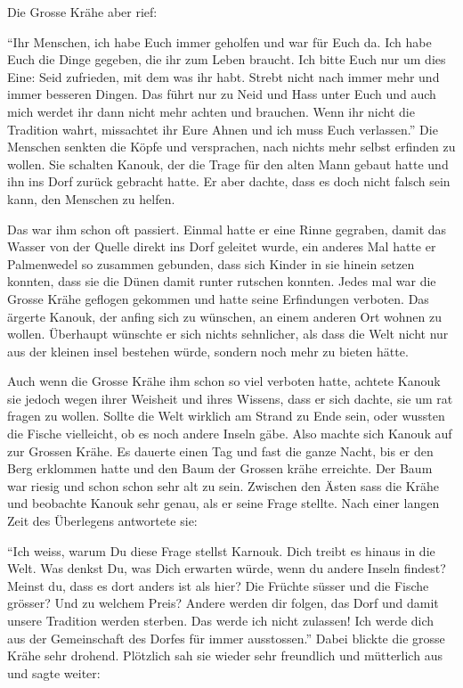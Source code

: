 Die Grosse Krähe aber rief: 

\enquote{Ihr Menschen, ich habe Euch immer geholfen und war für Euch da. Ich habe Euch die Dinge gegeben, die ihr zum Leben braucht. Ich bitte Euch nur um dies Eine: Seid zufrieden, mit dem was ihr habt. Strebt nicht nach immer mehr und immer besseren Dingen. Das führt nur zu Neid und Hass unter Euch und auch mich werdet ihr dann nicht mehr achten und brauchen. Wenn ihr nicht die Tradition wahrt, missachtet ihr Eure Ahnen und  ich muss Euch verlassen.} Die Menschen senkten die Köpfe und versprachen, nach nichts mehr selbst erfinden zu wollen. Sie schalten Kanouk, der die Trage für den alten Mann gebaut hatte und ihn ins Dorf zurück gebracht hatte. Er aber dachte, dass es doch nicht falsch sein kann, den Menschen zu helfen.

Das war ihm schon oft passiert. Einmal hatte er eine Rinne gegraben, damit das Wasser von der Quelle direkt ins Dorf geleitet wurde, ein anderes Mal hatte er Palmenwedel so zusammen gebunden, dass sich Kinder in sie hinein setzen konnten, dass sie die Dünen damit runter rutschen konnten. Jedes mal war die Grosse Krähe geflogen gekommen und hatte seine Erfindungen verboten. Das ärgerte Kanouk, der anfing sich zu wünschen, an einem anderen Ort wohnen zu wollen. Überhaupt wünschte er sich nichts sehnlicher, als dass die Welt nicht nur aus der kleinen insel bestehen würde, sondern noch mehr zu bieten hätte.

Auch wenn die Grosse Krähe ihm schon so viel verboten hatte, achtete Kanouk sie jedoch wegen ihrer Weisheit und ihres Wissens, dass er sich dachte, sie um rat fragen zu wollen. Sollte die Welt wirklich am Strand zu Ende sein, oder wussten die Fische vielleicht, ob es noch andere Inseln gäbe. Also machte sich Kanouk auf zur Grossen Krähe. Es dauerte einen Tag und fast die ganze Nacht, bis er den Berg erklommen hatte und den Baum der Grossen krähe erreichte. Der Baum war riesig und schon schon sehr alt zu sein. Zwischen den Ästen sass die Krähe und beobachte Kanouk sehr genau, als er seine Frage stellte. Nach einer langen Zeit des Überlegens antwortete sie:

\enquote{Ich weiss, warum Du diese Frage stellst Karnouk. Dich treibt es hinaus in die Welt. Was denkst Du, was Dich erwarten würde, wenn du andere Inseln findest? Meinst du, dass es dort anders ist als hier? Die Früchte süsser und die Fische grösser? Und zu welchem Preis? Andere werden dir folgen, das Dorf und damit unsere Tradition werden sterben. Das werde ich nicht zulassen! Ich werde dich aus der Gemeinschaft des Dorfes für immer ausstossen.} Dabei blickte die grosse Krähe sehr drohend. Plötzlich sah sie wieder sehr freundlich und mütterlich aus und sagte weiter:

